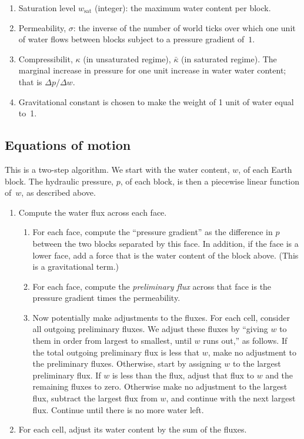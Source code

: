 \documentclass[10pt, a4paper, twocolumn]{article}
\begin{document}
\begin{enumerate}
\item Saturation level $w_{\text{sat}}$ (integer): the maximum water
  content per block.
\item Permeability, $\sigma$: the inverse of the number of world ticks over
  which one unit of water flows between blocks subject to a pressure
  gradient of~$1$.
\item Compressibilit, $\kappa$ (in unsaturated regime), $\bar{\kappa}$ (in
  saturated regime). The marginal increase in pressure for one unit
  increase in water water content; that is $\Delta p/\Delta w$. 
\item Gravitational constant is chosen to make the weight of 1 unit of
  water equal to~1.
\end{enumerate}
  
\subsection{Equations of motion}

This is a two-step algorithm. We start with the water content, $w$, of
each Earth block. The hydraulic pressure, $p$, of each block, is then
a piecewise linear function of~$w$, as described above.

\begin{enumerate}
\item Compute the water flux across each face.
  \begin{enumerate}
  \item For each face, compute the ``pressure gradient'' as the
    difference in $p$ between the two blocks separated by this
    face. In addition, if the face is a lower face, add a force that
    is the water content of the block above. (This is a gravitational
    term.)

  \item For each face, compute the \emph{preliminary flux} across that
    face is the pressure gradient times the permeability.

  \item Now potentially make adjustments to the fluxes. For each cell,
    consider all outgoing preliminary fluxes. We adjust these fluxes
    by ``giving $w$ to them in order from largest to smallest, until
    $w$ runs out,'' as follows. If the total outgoing preliminary flux
    is less that $w$, make no adjustment to the preliminary
    fluxes. Otherwise, start by assigning $w$ to the largest
    preliminary flux. If $w$ is less than the flux, adjust that flux
    to $w$ and the remaining fluxes to zero. Otherwise make no
    adjustment to the largest flux, subtract the largest flux from
    $w$, and continue with the next largest flux. Continue until there
    is no more water left.
  \end{enumerate}

\item For each cell, adjust its water content by the sum of the
  fluxes.
\end{enumerate}
\end{document}
